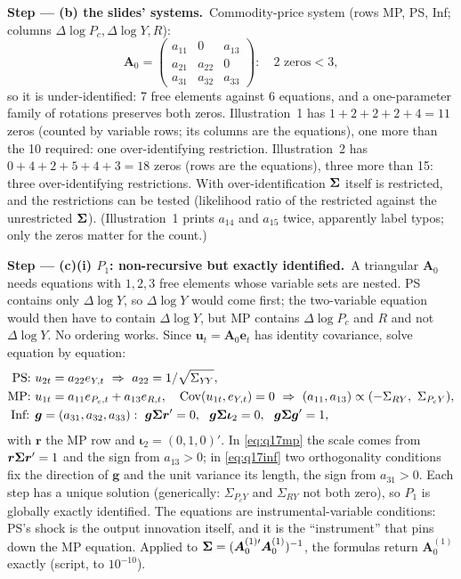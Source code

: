 \documentclass[11pt,a4paper]{article}
\newcommand{\passo}[2]{\par\smallskip\noindent\textbf{Step --- #1.}~#2}
\begin{document}
\begin{sol}
\passo{(b) the slides' systems}{Commodity-price system (rows MP, PS, Inf; columns $\Delta\log P_c,\Delta\log Y,R$):
\begin{equation}
\bm A_0=\begin{pmatrix}a_{11}&0&a_{13}\\a_{21}&a_{22}&0\\a_{31}&a_{32}&a_{33}\end{pmatrix}:\quad 2\text{ zeros}<3,\nonumber
\end{equation}
so it is under-identified: 7 free elements against 6 equations, and a one-parameter family of rotations preserves both zeros.
Illustration~1 has $1+2+2+2+4=11$ zeros (counted by variable rows; its columns are the equations), one more than the 10
required: one over-identifying restriction. Illustration~2 has $0+4+2+5+4+3=18$ zeros (rows are the equations), three more than
15: three over-identifying restrictions. With over-identification $\bm{\Sigma}$ itself is restricted, and the restrictions can be
tested (likelihood ratio of the restricted against the unrestricted $\bm{\Sigma}$). (Illustration~1 prints $a_{14}$ and $a_{15}$ twice,
apparently label typos; only the zeros matter for the count.)}

\passo{(c)(i) $P_1$: non-recursive but exactly identified}{A triangular $\bm A_0$ needs equations with $1,2,3$ free elements whose
variable sets are nested. PS contains only $\Delta\log Y$, so $\Delta\log Y$ would come first; the two-variable equation would then
have to contain $\Delta\log Y$, but MP contains $\Delta\log P_c$ and $R$ and not $\Delta\log Y$. No ordering works. Since
$\bm u_t=\bm A_0\bm e_t$ has identity covariance, solve equation by equation:
\begin{align}
\text{PS: }&u_{2t}=a_{22}e_{Y,t}\ \Rightarrow\ a_{22}=1/\sqrt{\Sigma_{Y\!Y}},\label{eq:q17ps}\\
\text{MP: }&u_{1t}=a_{11}e_{P_c,t}+a_{13}e_{R,t},\quad \mathrm{Cov}(u_{1t},e_{Y,t})=0\ \Rightarrow\
(a_{11},a_{13})\propto(-\Sigma_{RY},\ \Sigma_{P_cY}),\label{eq:q17mp}\\
\text{Inf: }&\bm g=(a_{31},a_{32},a_{33}):\ \bm g\bSigma\bm r'=0,\ \ \bm g\bSigma\bm\iota_2=0,\ \ \bm g\bSigma\bm g'=1,\label{eq:q17inf}
\end{align}
with $\bm r$ the MP row and $\bm\iota_2=(0,1,0)'$. In \eqref{eq:q17mp} the scale comes from $\bm r\bm{\Sigma}\bm r'=1$ and the sign from
$a_{13}>0$; in \eqref{eq:q17inf} two orthogonality conditions fix the direction of $\bm g$ and the unit variance its length, the sign
from $a_{31}>0$. Each step has a unique solution (generically: $\Sigma_{P_cY}$ and $\Sigma_{RY}$ not both zero), so $P_1$ is globally
exactly identified. The equations are instrumental-variable
conditions: PS's shock is the output innovation itself, and it is the ``instrument'' that pins down the MP equation. Applied to
$\bm{\Sigma}=(\bm A_0^{(1)\prime}\bm A_0^{(1)})^{-1}$, the formulas return $\bm A_0^{(1)}$ exactly (script, to $10^{-10}$).}


\end{sol}
\end{document}
